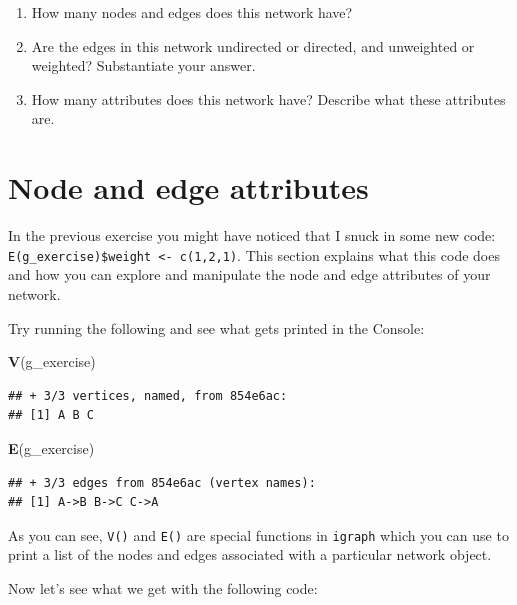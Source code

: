 \documentclass[
]{book}
\newenvironment{Shaded}{\begin{snugshade}}{\end{snugshade}}
\newcommand{\FunctionTok}[1]{\textcolor[rgb]{0.13,0.29,0.53}{\textbf{#1}}}
\newcommand{\NormalTok}[1]{#1}
\providecommand{\tightlist}{%
  \setlength{\itemsep}{0pt}\setlength{\parskip}{0pt}}
\begin{document}
\begin{enumerate}
\def\labelenumi{\arabic{enumi}.}
\tightlist
\item
  How many nodes and edges does this network have?
\item
  Are the edges in this network undirected or directed, and unweighted or weighted? Substantiate your answer.
\item
  How many attributes does this network have? Describe what these attributes are.
\end{enumerate}

\section{Node and edge attributes}\label{node-and-edge-attributes}

In the previous exercise you might have noticed that I snuck in some new code: \texttt{E(g\_exercise)\$weight\ \textless{}-\ c(1,2,1)}. This section explains what this code does and how you can explore and manipulate the node and edge attributes of your network.

Try running the following and see what gets printed in the Console:

\begin{Shaded}
\begin{Highlighting}[]
\FunctionTok{V}\NormalTok{(g\_exercise)}
\end{Highlighting}
\end{Shaded}

\begin{verbatim}
## + 3/3 vertices, named, from 854e6ac:
## [1] A B C
\end{verbatim}

\begin{Shaded}
\begin{Highlighting}[]
\FunctionTok{E}\NormalTok{(g\_exercise)}
\end{Highlighting}
\end{Shaded}

\begin{verbatim}
## + 3/3 edges from 854e6ac (vertex names):
## [1] A->B B->C C->A
\end{verbatim}

As you can see, \texttt{V()} and \texttt{E()} are special functions in \texttt{igraph} which you can use to print a list of the nodes and edges associated with a particular network object.

Now let's see what we get with the following code:
\end{document}

